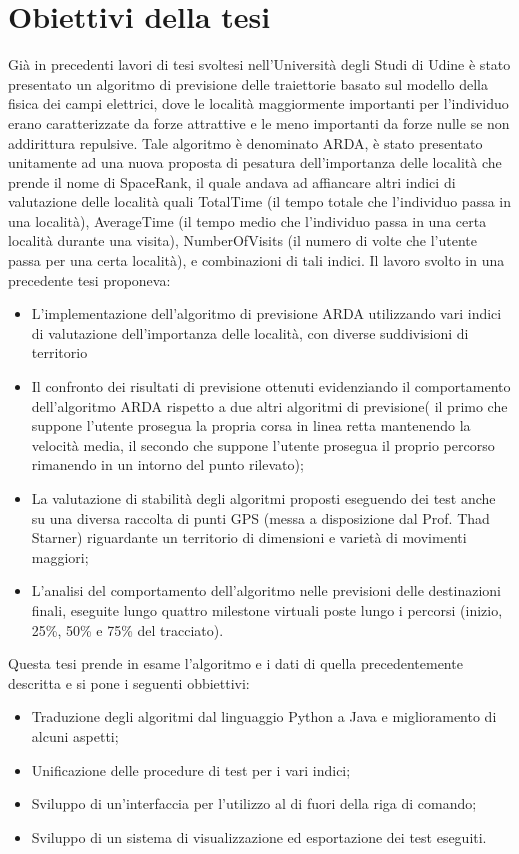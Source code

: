 \section{Obiettivi della tesi}
Gi\`a in precedenti lavori di tesi svoltesi nell'Universit\`a degli Studi di Udine \`e
stato presentato un algoritmo di previsione delle traiettorie basato sul modello
della fisica dei campi elettrici, dove le localit\`a maggiormente importanti
per l'individuo erano caratterizzate da forze attrattive e le meno importanti
da forze nulle se non addirittura repulsive. Tale algoritmo \`e denominato
ARDA, \`e stato presentato unitamente ad una nuova proposta di pesatura dell'importanza
delle localit\`a che prende il nome di SpaceRank, il quale andava
ad affiancare altri indici di valutazione delle localit\`a quali TotalTime (il tempo
totale che l'individuo passa in una localit\`a), AverageTime (il tempo medio che
l'individuo passa in una certa localit\`a durante una visita), NumberOfVisits (il
numero di volte che l'utente passa per una certa localit\`a), e combinazioni di
tali indici.
Il lavoro svolto in una precedente tesi \cite{new_1} proponeva:
\begin{itemize}
\item L'implementazione dell'algoritmo di previsione ARDA utilizzando vari indici di valutazione
dell'importanza delle localit\`a, con diverse suddivisioni di territorio

\item Il confronto dei risultati di previsione ottenuti evidenziando il comportamento
dell'algoritmo ARDA rispetto a due altri algoritmi di previsione( il primo
che suppone l'utente prosegua la propria corsa in linea retta mantenendo la
velocit\`a media, il secondo che suppone l'utente prosegua il proprio percorso
rimanendo in un intorno del punto rilevato);

\item La valutazione di stabilit\`a degli algoritmi proposti eseguendo dei test anche su una diversa raccolta di punti GPS (messa a disposizione
dal Prof. Thad Starner) riguardante un territorio di dimensioni e variet\`a di movimenti maggiori;

\item L'analisi del comportamento dell'algoritmo nelle previsioni delle destinazioni finali, eseguite
lungo quattro milestone virtuali poste lungo i percorsi (inizio, 25\%, 50\% e 75\% del tracciato).

\end{itemize}

Questa tesi prende in esame l'algoritmo e i dati di quella precedentemente descritta e si pone i seguenti obbiettivi:
\begin{itemize}
\item Traduzione degli algoritmi dal linguaggio Python a Java e miglioramento di alcuni aspetti;
\item Unificazione delle procedure di test per i vari indici;
\item Sviluppo di un'interfaccia per l'utilizzo al di fuori della riga di comando;
\item Sviluppo di un sistema di visualizzazione ed esportazione dei test eseguiti.
\end{itemize}

